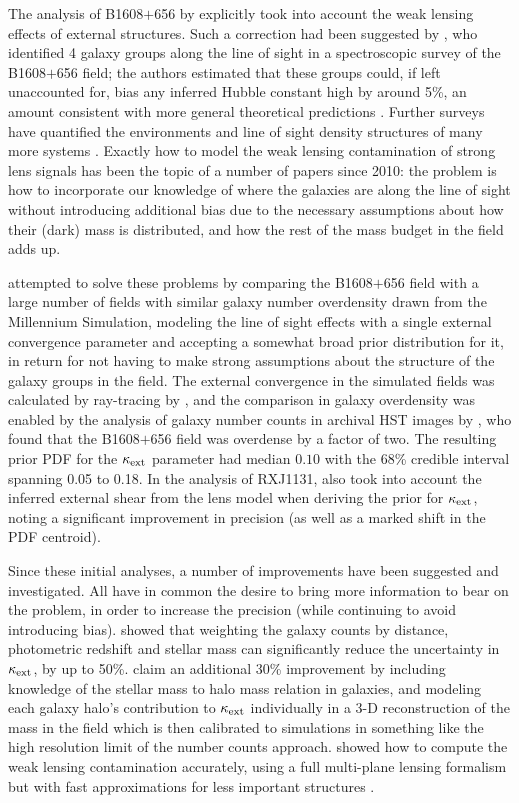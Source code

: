 The analysis of B1608$+$656 by \citet{Suy++10} explicitly took into
account the weak lensing effects of external structures.  Such a
correction had been suggested by \citet{Fas++06b}, who identified 4
galaxy groups along the line of sight in a spectroscopic survey of the
B1608$+$656 field; the authors estimated that these groups could,
if left unaccounted
for, bias any inferred Hubble constant high by around 5\%, an amount
consistent with more general theoretical predictions \citep{Bar96,K+Z04}.
Further surveys have quantified the environments and line of sight
density structures of many more systems \citep{Mom++06,Aug++07,Won++11,Mom++15}.
Exactly how
to model the weak lensing contamination of strong lens signals
has been the topic of a number of papers since
2010: the problem is how to incorporate our knowledge of where the
galaxies are along the line of sight without introducing additional
bias due to the necessary assumptions about how their (dark) mass is
distributed, and how the rest of the mass budget in the field adds up.

\citet{Suy++10} attempted to solve these problems by comparing the
B1608$+$656 field with a large number of fields with similar  galaxy
number overdensity drawn from the Millennium Simulation, modeling the
line of sight effects with a single external convergence parameter and
accepting a somewhat broad prior distribution for it, in return for not
having to make  strong assumptions about the structure of the galaxy
groups in the field. The external convergence in the simulated fields
was calculated by ray-tracing by \citet{Hil++09}, and the
comparison in galaxy overdensity was enabled by the analysis of galaxy
number counts in archival HST images by \citet{FKW11}, who found that
the B1608$+$656 field was overdense by a factor of two. The resulting
prior PDF for the $\kappa_{\rm ext}$ parameter had median $0.10$ with
the 68\% credible interval spanning 0.05 to 0.18.
In the analysis of RXJ1131, \citet{Suy++13} also took into account the
inferred external shear from the lens model when deriving the prior for
$\kappa_{\rm ext}$, noting a significant improvement in precision (as
well as a marked shift in the PDF centroid).

Since these initial analyses, a number of improvements have been
suggested and investigated. All have in common the desire to bring more
information  to bear on the problem, in order to increase the precision
(while  continuing to avoid introducing bias). \citet{Gre++13} showed
that weighting the galaxy counts by distance, photometric redshift and
stellar mass  can significantly reduce the uncertainty in $\kappa_{\rm
ext}$, by up to 50\%. \citet{CollettEtal2013} claim an additional 30\%
improvement  by including knowledge of the stellar mass to halo mass
relation in galaxies,  and modeling each galaxy halo's contribution to
$\kappa_{\rm ext}$ individually in a  3-D reconstruction of the mass in
the field which is then calibrated to simulations in something like the
high resolution limit of the number counts approach.
\citet{McCullyEtal2014} showed how to compute the weak lensing
contamination accurately, using a full multi-plane lensing formalism
\cite[see also][]{Schneider2014}
but with fast approximations for less important
structures \citep{McCullyEtal2016}.

